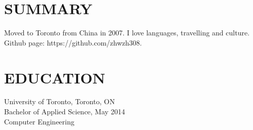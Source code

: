 \documentclass{res}
\begin{document}
 


\address{\bf  Unit 808, 38 Dan Leckie Way\\Toronto, ON M5V 2V6\\(416)
795-0370\\\href{mailto:wenzhong.zhang@mail.utoronto.ca}{wenzhong.zhang@mail.utoronto.ca}}
                                  
\begin{resume}

\section{SUMMARY}          
    Moved to Toronto from China in 2007. I love languages, travelling and culture.
    Github page: https://github.com/zhwzh308.
 
\section{EDUCATION}          
    University of Toronto, Toronto, ON  \\        
    Bachelor of Applied Science, May 2014   \\       
    Computer Engineering       \\   
 

\end{resume}
\end{document}
